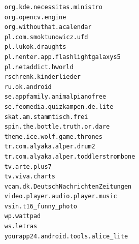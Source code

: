 \begin{verbatim}
    org.kde.necessitas.ministro
    org.opencv.engine
    org.withouthat.acalendar
    pl.com.smoktunowicz.ufd
    pl.lukok.draughts
    pl.nenter.app.flashlightgalaxys5
    pl.netaddict.hworld
    rschrenk.kinderlieder
    ru.ok.android
    se.appfamily.animalpianofree
    se.feomedia.quizkampen.de.lite
    skat.am.stammtisch.frei
    spin.the.bottle.truth.or.dare
    theme.ice.wolf.game.thrones
    tr.com.alyaka.alper.drum2
    tr.com.alyaka.alper.toddlerstrombone
    tv.arte.plus7
    tv.viva.charts
    vcam.dk.DeutschNachrichtenZeitungen
    video.player.audio.player.music
    vsin.t16_funny_photo
    wp.wattpad
    ws.letras
    yourapp24.android.tools.alice_lite
\end{verbatim}
 
%  
% 
